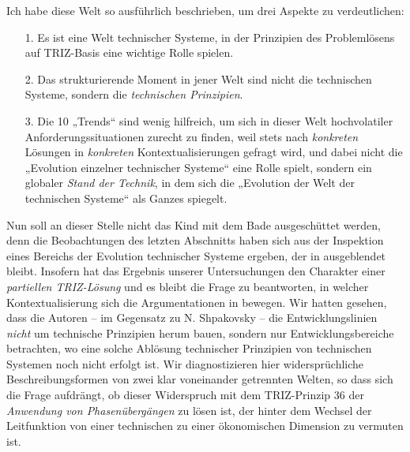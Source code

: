 \documentclass[12pt,a4paper]{article}
\begin{document}
Ich habe diese Welt so ausführlich beschrieben, um drei Aspekte zu
verdeutlichen:
\begin{itemize}
\item [1.] Es ist eine Welt technischer Systeme, in der Prinzipien des
  Problemlösens auf TRIZ-Basis eine wichtige Rolle spielen.
\item [2.] Das strukturierende Moment in jener Welt sind nicht die technischen
  Systeme, sondern die \emph{technischen Prinzipien}.
\item [3.] Die 10 „Trends“ sind wenig hilfreich, um sich in dieser Welt
  hochvolatiler Anforderungssituationen zurecht zu finden, weil stets nach
  \emph{konkreten} Lösungen in \emph{konkreten} Kontextualisierungen gefragt
  wird, und dabei nicht die „Evolution einzelner technischer Systeme“ eine
  Rolle spielt, sondern ein globaler \emph{Stand der Technik}, in dem sich die
  „Evolution der Welt der technischen Systeme“ als Ganzes spiegelt. 
\end{itemize}

Nun soll an dieser Stelle nicht das Kind mit dem Bade ausgeschüttet werden,
denn die Beobachtungen des letzten Abschnitts haben sich aus der Inspektion
eines Bereichs der Evolution technischer Systeme ergeben, der in
\cite{TESE2018} ausgeblendet bleibt.  Insofern hat das Ergebnis unserer
Untersuchungen den Charakter einer \emph{partiellen TRIZ-Lösung} und es bleibt
die Frage zu beantworten, in welcher Kontextualisierung sich die
Argumentationen in \cite{TESE2018} bewegen. Wir hatten gesehen, dass die
Autoren -- im Gegensatz zu N. Shpakovsky \cite{Shpakovsky2010} -- die
Entwicklungslinien \emph{nicht} um technische Prinzipien herum bauen, sondern
nur Entwicklungsbereiche betrachten, wo eine solche Ablösung technischer
Prinzipien von technischen Systemen noch nicht erfolgt ist.  Wir
diagnostizieren hier widersprüchliche Beschreibungsformen von zwei klar
voneinander getrennten Welten, so dass sich die Frage aufdrängt, ob dieser
Widerspruch mit dem TRIZ-Prinzip 36 der \emph{Anwendung von Phasenübergängen}
zu lösen ist, der hinter dem Wechsel der Leitfunktion von einer technischen zu
einer ökonomischen Dimension zu vermuten ist.
\end{document}
